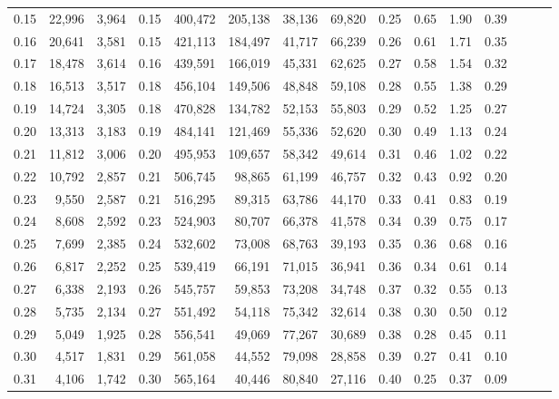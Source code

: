 \begin{tabular}{rrrrrrrrrrrrrrr}
0.15 &  22,996 &  3,964 &  0.15 &  400,472 &  205,138 &   38,136 &   69,820 &  0.25 &  0.65 &  1.90 &      0.39 \\
0.16 &  20,641 &  3,581 &  0.15 &  421,113 &  184,497 &   41,717 &   66,239 &  0.26 &  0.61 &  1.71 &      0.35 \\
0.17 &  18,478 &  3,614 &  0.16 &  439,591 &  166,019 &   45,331 &   62,625 &  0.27 &  0.58 &  1.54 &      0.32 \\
0.18 &  16,513 &  3,517 &  0.18 &  456,104 &  149,506 &   48,848 &   59,108 &  0.28 &  0.55 &  1.38 &      0.29 \\
0.19 &  14,724 &  3,305 &  0.18 &  470,828 &  134,782 &   52,153 &   55,803 &  0.29 &  0.52 &  1.25 &      0.27 \\
0.20 &  13,313 &  3,183 &  0.19 &  484,141 &  121,469 &   55,336 &   52,620 &  0.30 &  0.49 &  1.13 &      0.24 \\
0.21 &  11,812 &  3,006 &  0.20 &  495,953 &  109,657 &   58,342 &   49,614 &  0.31 &  0.46 &  1.02 &      0.22 \\
0.22 &  10,792 &  2,857 &  0.21 &  506,745 &   98,865 &   61,199 &   46,757 &  0.32 &  0.43 &  0.92 &      0.20 \\
0.23 &   9,550 &  2,587 &  0.21 &  516,295 &   89,315 &   63,786 &   44,170 &  0.33 &  0.41 &  0.83 &      0.19 \\
0.24 &   8,608 &  2,592 &  0.23 &  524,903 &   80,707 &   66,378 &   41,578 &  0.34 &  0.39 &  0.75 &      0.17 \\
0.25 &   7,699 &  2,385 &  0.24 &  532,602 &   73,008 &   68,763 &   39,193 &  0.35 &  0.36 &  0.68 &      0.16 \\
0.26 &   6,817 &  2,252 &  0.25 &  539,419 &   66,191 &   71,015 &   36,941 &  0.36 &  0.34 &  0.61 &      0.14 \\
0.27 &   6,338 &  2,193 &  0.26 &  545,757 &   59,853 &   73,208 &   34,748 &  0.37 &  0.32 &  0.55 &      0.13 \\
0.28 &   5,735 &  2,134 &  0.27 &  551,492 &   54,118 &   75,342 &   32,614 &  0.38 &  0.30 &  0.50 &      0.12 \\
0.29 &   5,049 &  1,925 &  0.28 &  556,541 &   49,069 &   77,267 &   30,689 &  0.38 &  0.28 &  0.45 &      0.11 \\
0.30 &   4,517 &  1,831 &  0.29 &  561,058 &   44,552 &   79,098 &   28,858 &  0.39 &  0.27 &  0.41 &      0.10 \\
0.31 &   4,106 &  1,742 &  0.30 &  565,164 &   40,446 &   80,840 &   27,116 &  0.40 &  0.25 &  0.37 &      0.09 \\

\end{tabular}
